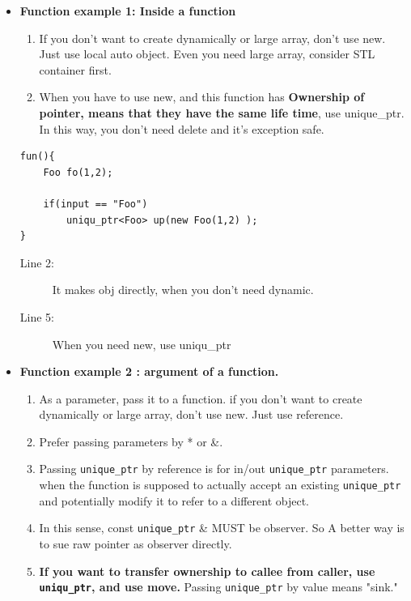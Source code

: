 \documentclass[a4paper,11pt,twoside]{book}
\begin{document}
\begin{itemize}

\item \textbf{Function example 1: Inside a function}
\begin{enumerate}
\item If you don't want to create dynamically or large array, don't use new. Just use local auto object. Even you need large array, consider STL container first.
\item When you have to use new, and this function has \textbf{Ownership of pointer, means that they have the same life time},  use unique\_ptr. In this way, you don't need delete and it's exception safe.
\end{enumerate}
\begin{lstlisting}[numbers=none]
fun(){
	Foo fo(1,2);
	
	if(input == "Foo")
		uniqu_ptr<Foo> up(new Foo(1,2) );
}
\end{lstlisting}
\begin{description}
	\item[Line 2:] It makes obj directly, when you don't need dynamic.
	\item[Line 5:] When you need new, use uniqu\_ptr
\end{description}


\item \textbf{Function example 2 : argument of a function.}
\begin{enumerate}
\item As a parameter, pass it to a function. if you don't want to create dynamically or large array, don't use new. Just use reference.

\item Prefer passing parameters by * or \&.

\item Passing \texttt{unique\_ptr} by reference is for in/out \texttt{unique\_ptr} parameters. when the function is supposed to actually accept an existing \texttt{unique\_ptr} and potentially modify it to refer to a different object. 

\item In this sense, const \texttt{unique\_ptr} \& MUST be observer. So A better way is to sue raw pointer as observer directly.

\item \textbf{If you want to transfer ownership to callee from caller, use \texttt{uniqu\_ptr}, and use move.} Passing \texttt{unique\_ptr} by value means "sink."


\end{enumerate}
\end{itemize}
\end{document}
